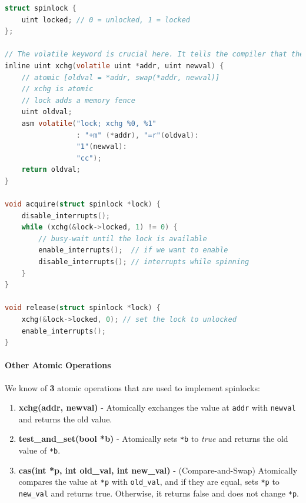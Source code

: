\documentclass[openany,12pt]{book}
\newcommand{\code}[1]{\texttt{#1}}
\begin{document}
\begin{lstlisting}[language=C, caption={Spinlock Implementation}, label={lst:spinlock}]
struct spinlock {
    uint locked; // 0 = unlocked, 1 = locked
};

// The volatile keyword is crucial here. It tells the compiler that the value at addr can be changed by external factors (like another CPU core or hardware) at any time. This prevents the compiler from making optimizations like caching the value in a register, forcing it to read directly from memory every time.
inline uint xchg(volatile uint *addr, uint newval) {
    // atomic [oldval = *addr, swap(*addr, newval)]
    // xchg is atomic
    // lock adds a memory fence
    uint oldval;
    asm volatile("lock; xchg %0, %1"
                 : "+m" (*addr), "=r"(oldval):
                 "1"(newval):
                 "cc");
    return oldval;
}

void acquire(struct spinlock *lock) {
    disable_interrupts();
    while (xchg(&lock->locked, 1) != 0) {
        // busy-wait until the lock is available
        enable_interrupts();  // if we want to enable
        disable_interrupts(); // interrupts while spinning
    }
}

void release(struct spinlock *lock) {
    xchg(&lock->locked, 0); // set the lock to unlocked
    enable_interrupts(); 
}
\end{lstlisting}


\paragraph{Other Atomic Operations} We know of \textbf{3} atomic operations that are used to implement spinlocks:
\begin{enumerate}
  \item \textbf{xchg(addr, newval)} - Atomically exchanges the value at \code{addr} with \code{newval} and returns the old value.

  \item \textbf{test\_and\_set(bool *b)} - Atomically sets \code{*b} to \textit{true} and returns the old value of \code{*b}.

  \item \textbf{cas(int *p, int old\_val, int new\_val)} - (Compare-and-Swap) Atomically compares the value at \code{*p} with \code{old\_val}, and if they are equal, sets \code{*p} to \code{new\_val} and returns true. Otherwise, it returns false and does not change \code{*p}.
\end{enumerate}
\end{document}
